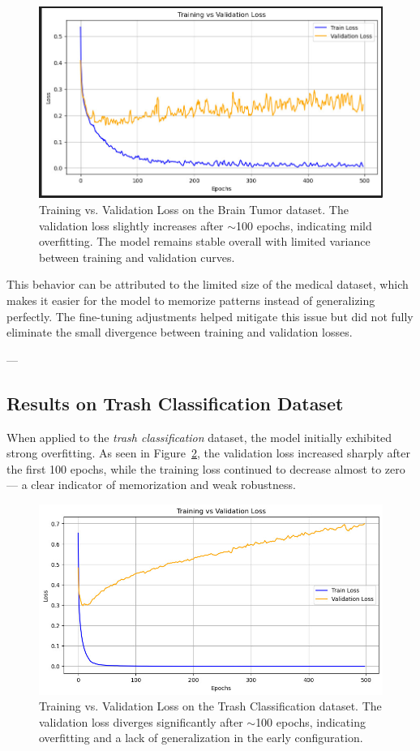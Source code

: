 \documentclass[12pt]{article}
\begin{document}
\begin{figure}[H]
\centering
\includegraphics[width=0.8\linewidth]{loss_curve_before1.jpeg}
\caption{Training vs. Validation Loss on the Brain Tumor dataset. 
The validation loss slightly increases after $\sim$100 epochs, indicating mild overfitting. 
The model remains stable overall with limited variance between training and validation curves.}
\label{fig:brain_tumor_loss}
\end{figure}

This behavior can be attributed to the limited size of the medical dataset, 
which makes it easier for the model to memorize patterns instead of generalizing perfectly. 
The fine-tuning adjustments helped mitigate this issue but did not fully eliminate the small divergence between training and validation losses.

---

\subsection{Results on Trash Classification Dataset}

When applied to the \textit{trash classification} dataset, 
the model initially exhibited strong overfitting. 
As seen in Figure~\ref{fig:trash_loss}, 
the validation loss increased sharply after the first 100 epochs, 
while the training loss continued to decrease almost to zero — 
a clear indicator of memorization and weak robustness.

\begin{figure}[H]
\centering
\includegraphics[width=0.8\linewidth]{loss_curve_before2.jpeg}
\caption{Training vs. Validation Loss on the Trash Classification dataset. 
The validation loss diverges significantly after $\sim$100 epochs, 
indicating overfitting and a lack of generalization in the early configuration.}
\label{fig:trash_loss}
\end{figure}
\end{document}
